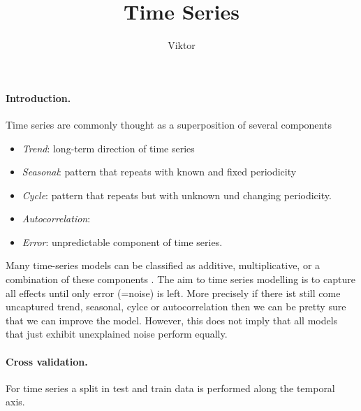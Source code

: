 \documentclass[12pt,a4paper]{article}
\begin{document}

\title{Time Series}
\author{Viktor}
\maketitle
\paragraph{Introduction.}
Time series are commonly thought as a superposition of several components
\begin{itemize}
	\item \textit{Trend}: long-term direction of time series
	\item \textit{Seasonal}: pattern that repeats with known and fixed periodicity 
	\item \textit{Cycle}: pattern that repeats but with unknown und changing periodicity.
	\item \textit{Autocorrelation}:
	\item \textit{Error}: unpredictable component of time series.
\end{itemize}

Many time-series models can be classified as additive, multiplicative, or a combination of these components \cite{hyndman_forecasting_with_exponential_smoothing}. The aim to time series modelling is to capture all effects until only error (=noise) is left. More precisely if there ist still come uncaptured trend, seasonal, cylce or autocorrelation then we can be pretty sure that we can improve the model. However, this does not imply that all models that just exhibit unexplained noise perform equally.  
 
\paragraph{Cross validation.} For time series a split in test and train data is performed along the temporal axis.
\end{document}
